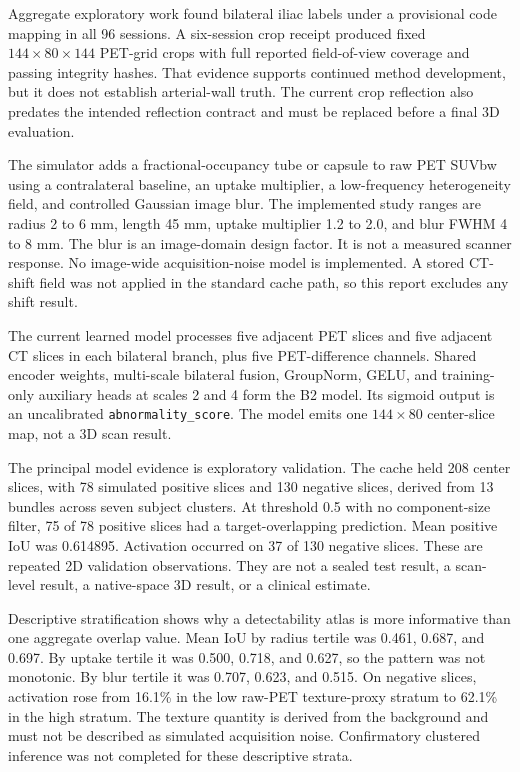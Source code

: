 \documentclass[11pt]{article}
\newcommand{\scoreterm}{\texttt{abnormality\_score}}
\begin{document}
Aggregate exploratory work found bilateral iliac labels under a provisional code mapping in all 96 sessions. A six-session crop receipt produced fixed $144 \times 80 \times 144$ PET-grid crops with full reported field-of-view coverage and passing integrity hashes. That evidence supports continued method development, but it does not establish arterial-wall truth. The current crop reflection also predates the intended reflection contract and must be replaced before a final 3D evaluation.

The simulator adds a fractional-occupancy tube or capsule to raw PET SUVbw using a contralateral baseline, an uptake multiplier, a low-frequency heterogeneity field, and controlled Gaussian image blur. The implemented study ranges are radius 2 to 6 mm, length 45 mm, uptake multiplier 1.2 to 2.0, and blur FWHM 4 to 8 mm. The blur is an image-domain design factor. It is not a measured scanner response. No image-wide acquisition-noise model is implemented. A stored CT-shift field was not applied in the standard cache path, so this report excludes any shift result.

The current learned model processes five adjacent PET slices and five adjacent CT slices in each bilateral branch, plus five PET-difference channels. Shared encoder weights, multi-scale bilateral fusion, GroupNorm, GELU, and training-only auxiliary heads at scales 2 and 4 form the B2 model. Its sigmoid output is an uncalibrated \scoreterm. The model emits one $144 \times 80$ center-slice map, not a 3D scan result.

The principal model evidence is exploratory validation. The cache held 208 center slices, with 78 simulated positive slices and 130 negative slices, derived from 13 bundles across seven subject clusters. At threshold 0.5 with no component-size filter, 75 of 78 positive slices had a target-overlapping prediction. Mean positive IoU was 0.614895. Activation occurred on 37 of 130 negative slices. These are repeated 2D validation observations. They are not a sealed test result, a scan-level result, a native-space 3D result, or a clinical estimate.

Descriptive stratification shows why a detectability atlas is more informative than one aggregate overlap value. Mean IoU by radius tertile was 0.461, 0.687, and 0.697. By uptake tertile it was 0.500, 0.718, and 0.627, so the pattern was not monotonic. By blur tertile it was 0.707, 0.623, and 0.515. On negative slices, activation rose from 16.1\% in the low raw-PET texture-proxy stratum to 62.1\% in the high stratum. The texture quantity is derived from the background and must not be described as simulated acquisition noise. Confirmatory clustered inference was not completed for these descriptive strata.
\end{document}
